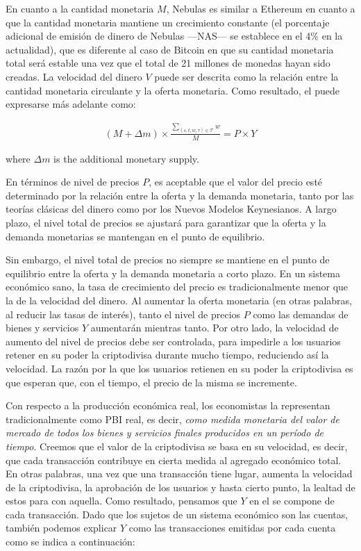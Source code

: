 En cuanto a la cantidad monetaria $M$, Nebulas es similar a Ethereum en cuanto a que la cantidad monetaria mantiene un crecimiento constante (el porcentaje adicional de emisión de dinero de Nebulas —NAS— se establece en el 4\% en la actualidad), que es diferente al caso de Bitcoin en que su cantidad monetaria total será estable una vez que el total de 21 millones de monedas hayan sido creadas. La velocidad del dinero $V$ puede ser descrita como la relación entre la cantidad monetaria circulante y la oferta monetaria. Como resultado, el  puede expresarse más adelante como:

\begin{align}
(M + \Delta{m}) \times \frac{\sum_{(s, t, w, \tau)\in \mathcal{T}}{w}}{M} = P \times Y
\label{eq:cur_ext}
\end{align}

\noindent where $\Delta{m}$ is the additional monetary supply.

En términos de nivel de precios $P$, es aceptable que el valor del precio esté determinado por la relación entre la oferta y la demanda monetaria, tanto por las teorías clásicas del dinero como por los Nuevos Modelos Keynesianos. A largo plazo, el nivel total de precios se ajustará para garantizar que la oferta y la demanda monetarias se mantengan en el punto de equilibrio.

Sin embargo, el nivel total de precios no siempre se mantiene en el punto de equilibrio entre la oferta y la demanda monetaria a corto plazo. En un sistema económico sano, la tasa de crecimiento del precio es tradicionalmente menor que la de la velocidad del dinero. Al aumentar la oferta monetaria (en otras palabras, al reducir las tasas de interés), tanto el nivel de precios $P$ como las demandas de bienes y servicios $Y$ aumentarán mientras tanto. Por otro lado, la velocidad de aumento del nivel de precios debe ser controlada, para impedirle a los usuarios retener en su poder la criptodivisa durante mucho tiempo, reduciendo así la velocidad. La razón por la que los usuarios retienen en su poder la criptodivisa es que esperan que, con el tiempo, el precio de la misma se incremente.

Con respecto a la producción económica real, los economistas la representan tradicionalmente como PBI real, es decir, \emph{como medida monetaria del valor de mercado de todos los bienes y servicios finales producidos en un período de tiempo}. Creemos que el valor de la criptodivisa se basa en su velocidad, es decir, que cada transacción contribuye en cierta medida al agregado económico total. En otras palabras, una vez que una transacción tiene lugar, aumenta la velocidad de la criptodivisa, la aprobación de los usuarios y hasta cierto punto, la lealtad de estos para con aquella. Como resultado, pensamos que $Y$ en el  se compone de cada transacción. Dado que los sujetos de un sistema económico son las cuentas, también podemos explicar $Y$ como las transacciones emitidas por cada cuenta como se indica a continuación:

